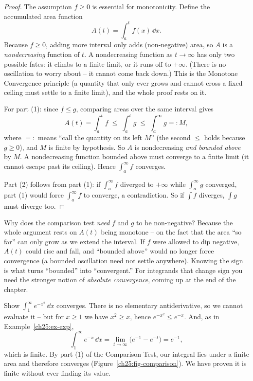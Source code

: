 \begin{proof}
The assumption $f \ge 0$ is essential for monotonicity. Define the accumulated area
function
\[
  A(t) = \int_a^{t} f(x)\,\dd x.
\]
Because $f \ge 0$, adding more interval only adds (non-negative) area, so $A$ is a
\emph{nondecreasing} function of $t$. A nondecreasing function as $t\to\infty$ has
only two possible fates: it climbs to a finite limit, or it runs off to $+\infty$.
(There is no oscillation to worry about -- it cannot come back down.) This is the
Monotone Convergence principle (a quantity that only ever grows and cannot cross
a fixed ceiling must settle to a finite limit), and the whole proof rests on it.

For part (1): since $f \le g$, comparing areas over the same interval gives
\[
  A(t) = \int_a^{t} f \;\le\; \int_a^{t} g \;\le\; \int_a^{\infty} g =: M,
\]
where $=:$ means ``call the quantity on its left $M$'' (the second $\le$ holds
because $g\ge 0$), and $M$ is finite by hypothesis. So $A$ is nondecreasing \emph{and bounded above}
by $M$. A nondecreasing function bounded above must converge to a finite limit
(it cannot escape past its ceiling). Hence $\int_a^\infty f$ converges.

Part (2) follows from part (1): if $\int_a^\infty f$ diverged to
$+\infty$ while $\int_a^\infty g$ converged, part (1) would force $\int_a^\infty f$
to converge, a contradiction. So if $\int f$ diverges, $\int g$ must diverge too.
\end{proof}

\begin{whybox}
Why does the comparison test \emph{need} $f$ and $g$ to be non-negative? Because
the whole argument rests on $A(t)$ being monotone -- on the fact that the area
``so far'' can only grow as we extend the interval. If $f$ were allowed to dip
negative, $A(t)$ could rise and fall, and ``bounded above'' would no longer force
convergence (a bounded oscillation need not settle anywhere). Knowing the sign is what
turns ``bounded'' into ``convergent.'' For integrands that change sign you need
the stronger notion of \emph{absolute convergence}, coming up at the end of the
chapter.
\end{whybox}

\begin{example}
\label{ch25:ex-gaussian-tail}
Show $\displaystyle\int_1^{\infty} e^{-x^2}\,\dd x$ converges. There is no
elementary antiderivative, so we cannot evaluate it -- but for $x \ge 1$ we have
$x^2 \ge x$, hence $e^{-x^2} \le e^{-x}$. And, as in
Example~\ref{ch25:ex-exp},
\[
  \int_1^\infty e^{-x}\,\dd x = \lim_{t\to\infty}\bigl(e^{-1}-e^{-t}\bigr) = e^{-1},
\]
which is finite. By part (1) of the Comparison Test, our integral lies under a
finite area and therefore converges (Figure~\ref{ch25:fig-comparison}). We have
proven it is finite without ever finding its value.
\end{example}

